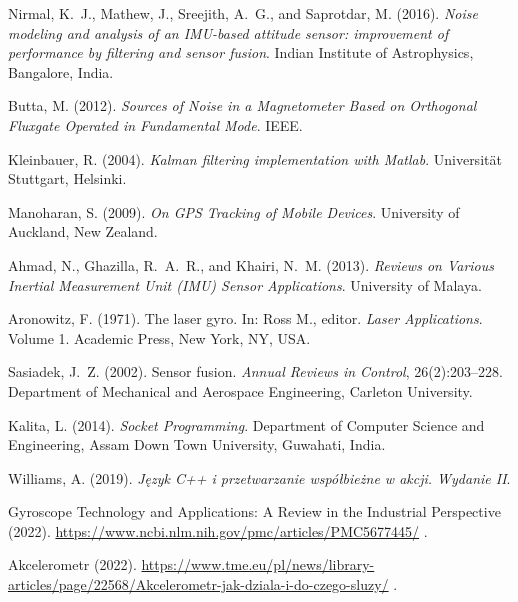 \begin{thebibliography}{99}
    Nirmal, K.~J., Mathew, J., Sreejith, A.~G., and Saprotdar, M. (2016).
    \newblock \emph{Noise modeling and analysis of an IMU-based attitude sensor: improvement of performance by filtering and sensor fusion}.
    \newblock Indian Institute of Astrophysics, Bangalore, India.

    Butta, M. (2012).
    \newblock \emph{Sources of Noise in a Magnetometer Based on Orthogonal Fluxgate Operated in Fundamental Mode}.
    \newblock IEEE.

    Kleinbauer, R. (2004).
    \newblock \emph{Kalman filtering implementation with Matlab}.
    \newblock Universität Stuttgart, Helsinki.

    Manoharan, S. (2009).
    \newblock \emph{On GPS Tracking of Mobile Devices}.
    \newblock University of Auckland, New Zealand.

    Ahmad, N., Ghazilla, R.~A.~R., and Khairi, N.~M. (2013).
    \newblock \emph{Reviews on Various Inertial Measurement Unit (IMU) Sensor Applications}.
    \newblock University of Malaya.

    Aronowitz, F. (1971).
    \newblock The laser gyro.
    \newblock In: Ross M., editor. \emph{Laser Applications}. Volume 1.
    \newblock Academic Press, New York, NY, USA.

    Sasiadek, J.~Z. (2002).
    \newblock Sensor fusion.
    \newblock \emph{Annual Reviews in Control}, 26(2):203--228.
    \newblock Department of Mechanical and Aerospace Engineering, Carleton University.

    Kalita, L. (2014).
    \newblock \emph{Socket Programming}.
    \newblock Department of Computer Science and Engineering, Assam Down Town University, Guwahati, India.

    Williams, A. (2019).
    \newblock \emph{Język C++ i przetwarzanie współbieżne w akcji. Wydanie II}.

    {Gyroscope Technology and Applications: A Review in the Industrial Perspective} (2022).
    \newblock \url{https://www.ncbi.nlm.nih.gov/pmc/articles/PMC5677445/}
    \newblock [Accessed: 21/11/2022].

    {Akcelerometr} (2022).
    \newblock \url{https://www.tme.eu/pl/news/library-articles/page/22568/Akcelerometr-jak-dziala-i-do-czego-sluzy/}
    \newblock [Accessed: 30/11/2022].


\end{thebibliography}
